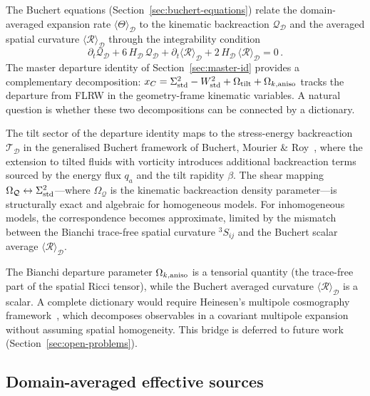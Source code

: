 The Buchert equations (Section~\ref{sec:buchert-equations})
relate the domain-averaged expansion rate
$\langle \Theta \rangle_{\mathcal{D}}$ to the kinematic
backreaction $\mathcal{Q}_{\mathcal{D}}$ and the averaged
spatial curvature
$\langle \mathcal{R} \rangle_{\mathcal{D}}$ through the
integrability condition
\begin{equation}\label{eq:buchert-integrability}
\partial_t \mathcal{Q}_{\mathcal{D}}
+ 6\,H_{\mathcal{D}}\, \mathcal{Q}_{\mathcal{D}}
+ \partial_t
  \langle \mathcal{R} \rangle_{\mathcal{D}}
+ 2\,H_{\mathcal{D}}\,
  \langle \mathcal{R} \rangle_{\mathcal{D}}
= 0\,.
\end{equation}
The master departure identity of
Section~\ref{sec:master-id} provides a complementary
decomposition: $x_C = \Sigma^2_{\mathrm{std}} - W^2_{\mathrm{std}} + \Omega_{\mathrm{tilt}} +
\Omega_{k,\mathrm{aniso}}$ tracks the departure from FLRW in the
geometry-frame kinematic variables.  A natural
question is whether these two decompositions can be
connected by a dictionary.

The tilt sector of the departure identity maps to the
stress-energy backreaction $\mathcal{T}_{\mathcal{D}}$
in the generalised Buchert framework of
Buchert, Mourier \&
Roy~\cite{BuchertMourierRoy2020}, where
the extension to tilted fluids with vorticity introduces
additional backreaction terms sourced by the energy flux
$q_a$ and the tilt rapidity $\beta$.  The shear mapping
$\Omega_{\mathcal{Q}} \leftrightarrow \Sigma^2_{\mathrm{std}}$---where
$\Omega_{\mathcal{Q}}$ is the kinematic backreaction
density parameter---is structurally exact and algebraic
for homogeneous models.  For inhomogeneous models, the
correspondence becomes approximate, limited by the
mismatch between the Bianchi trace-free spatial curvature
${}^3\!S_{ij}$ and the Buchert scalar average
$\langle \mathcal{R} \rangle_{\mathcal{D}}$.

\begin{remark}
\label{rem:bianchi-buchert-mismatch}
The Bianchi departure parameter $\Omega_{k,\mathrm{aniso}}$ is a tensorial
quantity (the trace-free part of the spatial Ricci
tensor), while the Buchert averaged curvature
$\langle \mathcal{R} \rangle_{\mathcal{D}}$ is a scalar.
A complete dictionary would require Heinesen's
multipole cosmography
framework~\cite{Heinesen2021}, which decomposes
observables in a covariant multipole expansion without
assuming spatial homogeneity.  This bridge is deferred
to future work (Section~\ref{sec:open-problems}).
\end{remark}


\subsection{Domain-averaged effective sources}
\label{sec:domain-sources}

